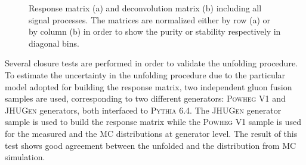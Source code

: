 \begin{figure}[!h]
\centering
{}
\caption{Response matrix (a) and deconvolution matrix (b) including all signal processes. The matrices are normalized either by row (a) or by column (b) in order to show the purity or stability respectively in diagonal bins.}\label{fig:matrix}
\end{figure}

Several closure tests are performed in order to validate the unfolding
procedure. To estimate the uncertainty in the unfolding procedure due to the
particular model adopted for building the response matrix, two independent
gluon fusion samples are used, corresponding to two different generators:
\textsc{Powheg V1} and \textsc{JHUGen} generators, both interfaced to \textsc{Pythia 6.4}.
The \textsc{JHUGen} generator sample is used to build the response matrix while the
\textsc{Powheg V1} sample is used for the measured and the MC distributions at
generator level. The result of this test shows good agreement between the unfolded and the distribution from MC simulation.

